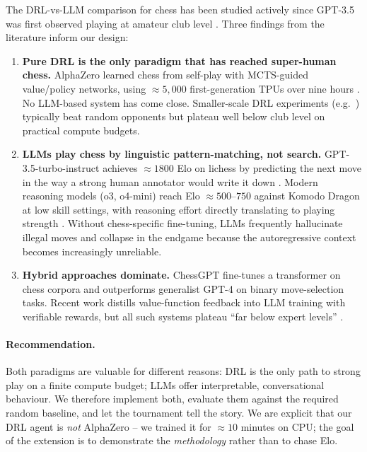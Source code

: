 \documentclass[11pt,a4paper]{article}
\begin{document}
The DRL-vs-LLM comparison for chess has been studied actively since
GPT-3.5 was first observed playing at amateur club level
\cite{carlini2023chessllm}. Three findings from the literature inform
our design:

\begin{enumerate}
  \item \textbf{Pure DRL is the only paradigm that has reached
    super-human chess.} AlphaZero learned chess from self-play with
    MCTS-guided value/policy networks, using $\approx5{,}000$
    first-generation TPUs over nine hours
    \cite{silver2018alphazero}. No LLM-based system has come close.
    Smaller-scale DRL experiments (e.g.\ \cite{zjeffer2022chesszero})
    typically beat random opponents but plateau well below club level
    on practical compute budgets.
  \item \textbf{LLMs play chess by linguistic pattern-matching, not
    search.} GPT-3.5-turbo-instruct achieves $\approx1800$ Elo on
    lichess by predicting the next move in the way a strong human
    annotator would write it down \cite{carlini2023chessllm}. Modern
    reasoning models (o3, o4-mini) reach Elo $\approx500$--$750$
    against Komodo Dragon at low skill settings, with reasoning effort
    directly translating to playing strength
    \cite{kolasani2025llmchess}. Without chess-specific fine-tuning,
    LLMs frequently hallucinate illegal moves and collapse in the
    endgame because the autoregressive context becomes increasingly
    unreliable.
  \item \textbf{Hybrid approaches dominate.} ChessGPT
    \cite{feng2023chessgpt} fine-tunes a transformer on chess corpora
    and outperforms generalist GPT-4 on binary move-selection tasks.
    Recent work distills value-function feedback into LLM training
    with verifiable rewards, but all such systems plateau ``far below
    expert levels'' \cite{strategicrl2025}.
\end{enumerate}

\paragraph{Recommendation.} Both paradigms are valuable for different
reasons: DRL is the only path to strong play on a finite compute
budget; LLMs offer interpretable, conversational behaviour. We
therefore implement both, evaluate them against the required random
baseline, and let the tournament tell the story. We are explicit that
our DRL agent is \emph{not} AlphaZero -- we trained it for $\approx10$
minutes on CPU; the goal of the extension is to demonstrate the
\emph{methodology} rather than to chase Elo.
\end{document}
